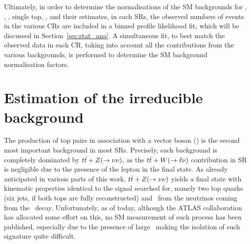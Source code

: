 		Ultimately, in order to determine the normalisations of the \ac{SM} backgrounds for \Zboson, \ttbar, \Wboson, single top, \ttZ, and their estimates, in each \acp{SR}, the observed numbers of events in the various \acp{CR} are included in a binned profile likelihood fit, which will be discussed in Section~\ref{sec:stat_ana}. A simultaneous fit, to best match the observed data in each \ac{CR}, taking into account all the contributions from the various backgrounds, is performed to determine the \ac{SM} background normalisation factors. 


	\section{Estimation of the irreducible background}
	\label{sec:ddbkgest}

		The production of top pairs in association with a vector boson (\ttV) is the second most important background in most \acp{SR}. Precisely, such background is completely dominated by $t\bar{t}+Z(\rightarrow \nu\nu)$, as the $t\bar{t}+W(\rightarrow \ell \nu)$ contribution in \ac{SR} is negligible due to the presence of the lepton in the final state. As already anticipated in various parts of this work, $t\bar{t}+Z(\rightarrow \nu\nu)$ yields a final state with kinematic properties identical to the signal searched for, namely two top quarks (six jets, if both tops are fully reconstructed) and \met\ from the neutrinos coming from the \Zboson\ decay. Unfortunately, as of today, although the \ac{ATLAS} collaboration has allocated some effort on this, no \ac{SM} measurement of such process has been published, especially due to the presence of large \met\ making the isolation of such signature quite difficult.


